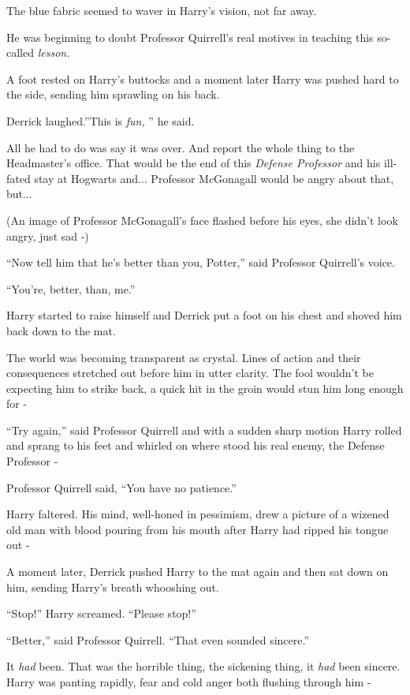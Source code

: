 The blue fabric seemed to waver in Harry's vision, not far away.

He was beginning to doubt Professor Quirrell's real motives in teaching
this so-called \emph{lesson.}

A foot rested on Harry's buttocks and a moment later Harry was pushed
hard to the side, sending him sprawling on his back.

Derrick laughed.''This is \emph{fun,} '' he said.

All he had to do was say it was over. And report the whole thing to the
Headmaster's office. That would be the end of this \emph{Defense
Professor} and his ill-fated stay at Hogwarts and... Professor
McGonagall would be angry about that, but...

(An image of Professor McGonagall's face flashed before his eyes, she
didn't look angry, just sad -)

``Now tell him that he's better than you, Potter,'' said Professor
Quirrell's voice.

``You're, better, than, me.''

Harry started to raise himself and Derrick put a foot on his chest and
shoved him back down to the mat.

The world was becoming transparent as crystal. Lines of action and their
consequences stretched out before him in utter clarity. The fool
wouldn't be expecting him to strike back, a quick hit in the groin would
stun him long enough for -

``Try again,'' said Professor Quirrell and with a sudden sharp motion
Harry rolled and sprang to his feet and whirled on where stood his real
enemy, the Defense Professor -

Professor Quirrell said, ``You have no patience.''

Harry faltered. His mind, well-honed in pessimism, drew a picture of a
wizened old man with blood pouring from his mouth after Harry had ripped
his tongue out -

A moment later, Derrick pushed Harry to the mat again and then sat down
on him, sending Harry's breath whooshing out.

``Stop!'' Harry screamed. ``Please stop!''

``Better,'' said Professor Quirrell. ``That even sounded sincere.''

It \emph{had} been. That was the horrible thing, the sickening thing, it
\emph{had} been sincere. Harry was panting rapidly, fear and cold anger
both flushing through him -

